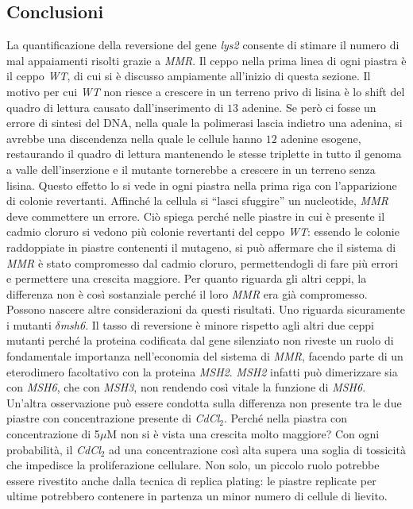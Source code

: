 \subsection*{Conclusioni}
La quantificazione della reversione del gene \emph{lys2} consente di stimare il numero di mal appaiamenti risolti grazie a \emph{MMR}. 
Il ceppo nella prima linea di ogni piastra è il ceppo \emph{WT}, di cui si è discusso ampiamente all'inizio di questa sezione. 
Il motivo per cui \emph{WT} non riesce a crescere in un terreno privo di lisina è lo shift del quadro di lettura causato dall'inserimento di $13$ adenine. 
Se però ci fosse un errore di sintesi del DNA, nella quale la polimerasi lascia indietro una adenina, si avrebbe una discendenza nella quale le cellule hanno $12$ adenine esogene, restaurando il quadro di lettura mantenendo le stesse triplette in tutto il genoma a valle dell'inserzione e il mutante tornerebbe a crescere in un terreno senza lisina. 
Questo effetto lo si vede in ogni piastra nella prima riga con l'apparizione di colonie revertanti. 
Affinché la cellula si ``lasci sfuggire'' un nucleotide, \emph{MMR} deve commettere un errore. 
Ciò spiega perché nelle piastre in cui è presente il cadmio cloruro si vedono più colonie revertanti del ceppo \emph{WT}: essendo le colonie raddoppiate in piastre contenenti il mutageno, si può affermare che il sistema di \emph{MMR} è stato compromesso dal cadmio cloruro, permettendogli di fare più errori e permettere una crescita maggiore. 
Per quanto riguarda gli altri ceppi, la differenza non è così sostanziale perché il loro \emph{MMR} era già compromesso. 
Possono nascere altre considerazioni da questi risultati. 
Uno riguarda sicuramente i mutanti \emph{$\delta$msh6}. 
Il tasso di reversione è minore rispetto agli altri due ceppi mutanti perché la proteina codificata dal gene silenziato non riveste un ruolo di fondamentale importanza nell'economia del sistema di \emph{MMR}, facendo parte di un eterodimero facoltativo con la proteina \emph{MSH2}. 
\emph{MSH2} infatti può dimerizzare sia con \emph{MSH6}, che con \emph{MSH3}, non rendendo così vitale la funzione di \emph{MSH6}. 
Un'altra osservazione può essere condotta sulla differenza non presente tra le due piastre con concentrazione presente di \emph{CdCl$_{2}$}. 
Perché nella piastra con concentrazione di 5$\mu$M non si è vista una crescita molto maggiore? Con ogni probabilità, il \emph{CdCl$_{2}$} ad una concentrazione così alta supera una soglia di tossicità che impedisce la proliferazione cellulare. 
Non solo, un piccolo ruolo potrebbe essere rivestito anche dalla tecnica di replica plating: le piastre replicate per ultime potrebbero contenere in partenza un minor numero di cellule di lievito. 
